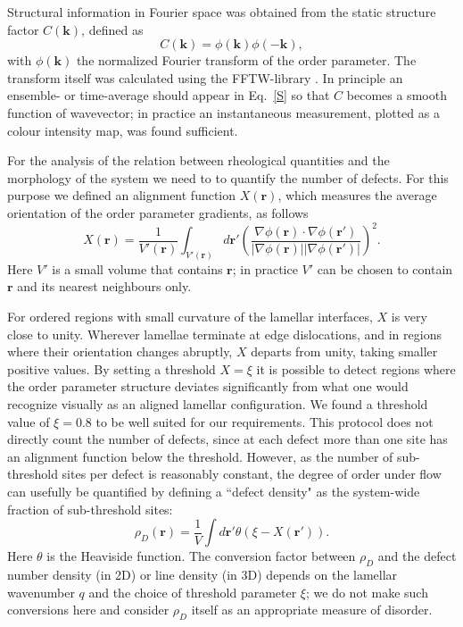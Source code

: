 \documentclass[8.5pt,twoside,twocolumn]{article}
\begin{document}
Structural information in Fourier space was obtained from the static structure factor $C({\mathbf k})$, defined as
%
\begin{equation}
C({\mathbf k})=\phi({\mathbf k})\phi(-{\mathbf k}),
\label{S}\end{equation}
%
with $\phi({\mathbf k})$ the normalized Fourier transform of the order parameter.
The transform itself was calculated using the FFTW-library \cite{FFTW}.
In principle an ensemble- or time-average should appear in Eq.~\ref{S} so that $C$ becomes a smooth function of wavevector; in practice an instantaneous measurement, plotted as a colour intensity map, was found sufficient.

For the analysis of the relation between rheological quantities and the morphology of the system we need to to quantify the number of defects.
For this purpose we defined an alignment function $X({\mathbf r})$, which measures the average orientation of the order parameter gradients, as follows
%
\begin{equation}\label{alignment}
X({\mathbf r})=\frac{1}{V'({\mathbf r})} \int_{V'({\mathbf r})} d{\mathbf r'} \left(\frac{\nabla \phi ({\mathbf r}) \cdot \nabla \phi ({\mathbf r'})}{|\nabla\phi ({\mathbf r}) ||\nabla\phi ({\mathbf r'}) |}\right)^2. 
\end{equation}
%
Here $V'$ is a small volume that contains $\mathbf r$; in practice $V'$ can be chosen to contain $\mathbf r$ and its nearest neighbours only.

For ordered regions with small curvature of the lamellar interfaces, $X$ is very close to unity. Wherever lamellae terminate at edge dislocations, and in regions where their orientation changes abruptly, $X$ departs from unity, taking smaller positive values.
By setting a threshold $X=\xi$ it is possible to detect regions where the order parameter structure deviates significantly from what one would recognize visually as an aligned lamellar configuration.
We found a threshold value of $\xi=0.8$ to be well suited for our requirements. This protocol does not directly count the number of defects, since at each defect more than one site has an alignment function below the threshold.
However, as the number of sub-threshold sites per defect is reasonably constant, the degree of order under flow can usefully be quantified by defining a ``defect density" as the system-wide fraction of sub-threshold sites:
%
\begin{equation}\label{defect density}
\rho_D({\mathbf r})=\frac{1}{V} \int d{\mathbf r'} \theta(\xi-X(\mathbf r')).  
\end{equation}
%
Here $\theta$ is the Heaviside function. The conversion factor between $\rho_D$ and the defect number density (in 2D) or line density (in 3D) depends on the lamellar wavenumber $q$ and the choice of threshold parameter $\xi$; we do not make such conversions here and consider $\rho_D$ itself as an appropriate measure of disorder.
\end{document}
